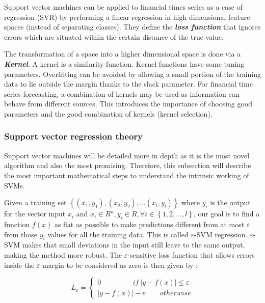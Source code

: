 \documentclass[11pt,a4paper,oneside]{book}
\begin{document}
Support vector machines can be applied to financial times series as a case of regression (SVR) by performing a linear regression in high dimensional feature spaces (instead of separating classes). They define the \textit{\textbf{loss function}} that ignores errors which are situated within the certain distance of the true value.

The transformation of a space into a higher dimensional space is done via a \textit{\textbf{Kernel}}. A kernel is a similarity function. Kernel functions have some tuning parameters. Overfitting can be avoided by allowing a small portion of the training data to lie outside the margin thanks to the slack parameter. For financial time series forecasting, a combination of kernels may be used as information can behave from different sources. This introduces the importance of choosing good parameters and the good combination of kernels (kernel selection). \cite{kim}\cite{liwang}\cite{Smola}


\subsubsection{Support vector regression theory}

Support vector machines will be detailed more in depth as it is the most novel algorithm and also the most promising. Therefore, this subsection will describe the most important mathematical steps to understand the intrinsic working of SVMs.

Given a training set $\left \{ \left ( x_{1}, y_{1} \right ), \left ( x_{2}, y_{2} \right ), ... \left ( x_{l}, y_{l} \right ) \right \}$ where $y_{i}$ is the output for the vector input $x_{i}$ and $x_{i} \in R^{n} , y_{i} \in R,  \forall i \in \left \{ 1,2, ...,l \right \}$, our goal is to find a function $f\left ( x \right )$ as flat as possible to make predictions different from at most $\varepsilon$ from those $y_{i}$ values for all the training data. This is called $\varepsilon$-SVM regression. $\varepsilon$-SVM makes that small deviations in the input still leave to the same output, making the method more robust. The $\varepsilon$-sensitive loss function that allows errors inside the $\varepsilon$ margin to be considered as zero is then given by :

\begin{equation}
L_{\varepsilon} = \left\{\begin{matrix}
0 \qquad\qquad\ \   if \ \left | y - f\left ( x \right )\right | \leq \varepsilon \\ 
\left | y - f\left ( x \right )\right | - \varepsilon \qquad otherwise
\end{matrix}\right.
\end{equation} \cite{Cortes}\cite{Smola} 
\end{document}
